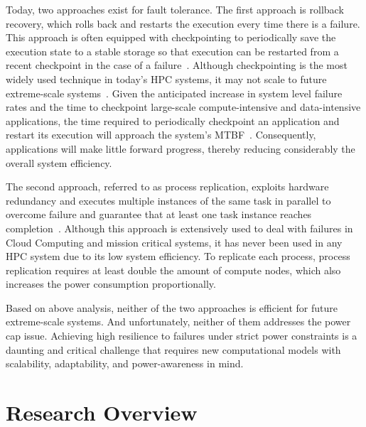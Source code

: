 Today, two approaches exist for fault tolerance. The first approach is rollback recovery, which rolls back and restarts the execution 
every time there is a failure. This approach is often equipped with checkpointing to periodically save the execution state to a 
stable storage so that execution can be restarted from a recent checkpoint in the case of a failure~\cite{Elnozahy:02:Survey,kalaiselvi_sadhana_2000,Chandy:1985:DSD:214451.214456}. 
Although checkpointing is the most widely used technique in today's HPC systems, it may not scale to 
future extreme-scale systems~\cite{ferreira_sc_2011,elnozahy_dsc_2004,4367962}. Given the anticipated increase in system level failure rates and the time to checkpoint large-scale 
compute-intensive and data-intensive applications, the time required to periodically checkpoint an application 
and restart its execution will approach the system's MTBF~\cite{Cappello:2009:TER:1640402.1640428}. Consequently, applications will make little forward progress, thereby 
reducing considerably the overall system efficiency. 

The second approach, referred to as process replication, exploits hardware redundancy and executes multiple instances of the same task 
in parallel to overcome failure and guarantee that at least one task instance reaches completion~\cite{bartlett_1981_nonstop,tsai_isads_2011,ferreira_sc_2011}. Although this approach is extensively used 
to deal with failures in 
Cloud Computing and mission critical systems, it has 
never been used in any HPC system due to its low system efficiency. To replicate each process, process replication requires 
at least double the amount of compute nodes, which also increases the power consumption proportionally. 

Based on above analysis, neither of the two approaches is efficient for future extreme-scale systems. And unfortunately, neither 
of them addresses the power cap issue. 
Achieving high resilience to failures under strict power constraints is a daunting and critical challenge that requires new 
computational models with scalability, adaptability, and power-awareness in mind. 
 
\section{Research Overview}

